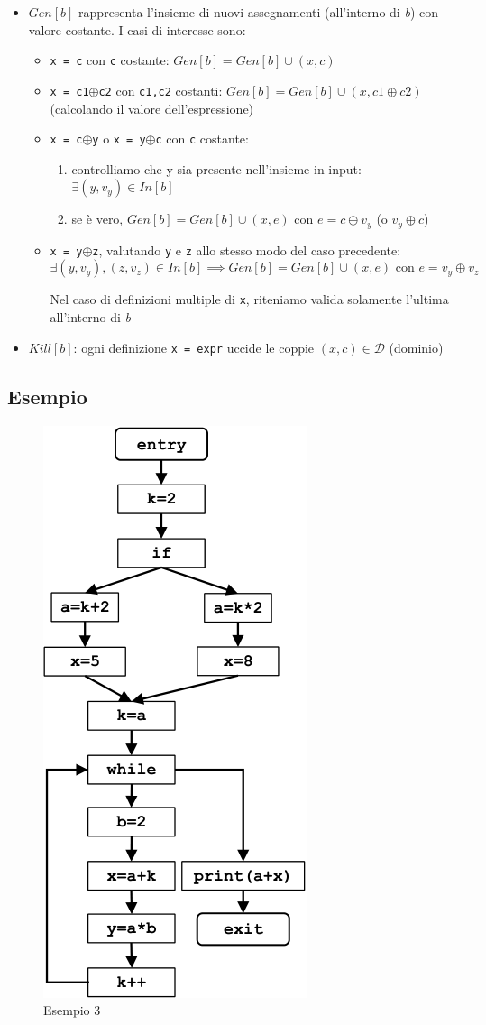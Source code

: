 \documentclass[10pt,a4paper]{article}
\begin{document}
\begin{itemize}
  \item $Gen[b]$ rappresenta l'insieme di nuovi assegnamenti (all'interno di \textit{b}) con valore costante. I casi di interesse sono:
\begin{itemize}
  \item \lstinline|x = c| con \lstinline|c| costante: $Gen[b] = Gen[b] \cup (x,c)$
  \item \lstinline|x = c1|$\oplus$\lstinline|c2| con \lstinline|c1,c2| costanti: $Gen[b] = Gen[b] \cup (x,c1\oplus c2)$ (calcolando il valore dell'espressione)
  \item \lstinline|x = c|$\oplus$\lstinline|y| o \lstinline|x = y|$\oplus$\lstinline|c| con \lstinline|c| costante:
\begin{enumerate}
  \item controlliamo che y sia presente nell'insieme in input: $\exists (y,v_{y}) \in In[b]$
  \item se \`e vero, $Gen[b] = Gen[b] \cup (x,e)$ con $e = c\oplus v_{y}$ (o $v_{y}\oplus c$)
\end{enumerate}
\item \lstinline|x = y|$\oplus$\lstinline|z|, valutando \lstinline|y| e \lstinline|z| allo stesso modo del caso precedente:
  \begin{equation*}
    \exists (y,v_{y}), (z,v_{z})\in In[b] \implies Gen[b] = Gen[b] \cup (x,e) \text{~con~} e=v_{y}\oplus v_{z}
  \end{equation*}

\begin{mdframed}
  Nel caso di definizioni multiple di \lstinline|x|, riteniamo valida solamente l'ultima all'interno di \textit{b}
\end{mdframed}
\end{itemize}
\item $Kill[b]$: ogni definizione \lstinline|x = expr| uccide le coppie $(x,c)\in \mathcal{D}$ (dominio)
\end{itemize}

\subsection{Esempio}

\begin{figure}[h!]
  \centering
  \includegraphics[width=.3\textwidth]{example-3.png}
  \caption{Esempio 3}
\end{figure}
\end{document}
